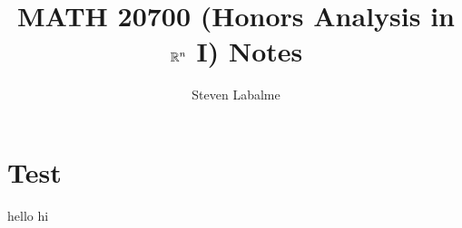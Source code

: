 \documentclass{report}
\title{MATH 20700 (Honors Analysis in $\mathbb{R}^n$ I) Notes}
\author{Steven Labalme}
\begin{document}
\maketitle



\tableofcontents
\newpage



\pagestyle{main}
\renewcommand{\chaptermark}[1]{\markboth{\chaptername\ \thechapter\ (#1)}{}}
\chapter{Test}
hello
\newpage
hi
\end{document}

